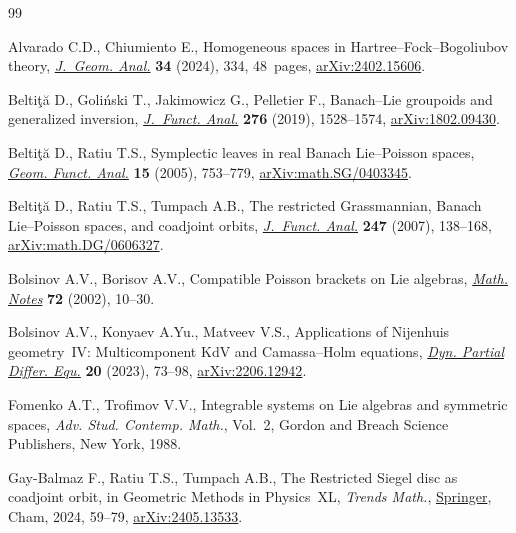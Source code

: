 \documentclass[10pt,a4paper]{amsart}
\theoremstyle{definition}
\numberwithin{equation}{section}
\let\MFOriginalCedilla\c
\renewcommand{\c}[1]{{\MFcedillafont\MFOriginalCedilla{#1}}}
\begin{document}
\begin{thebibliography}{99}
\footnotesize\itemsep=0pt

Alvarado C.D., Chiumiento E., Homogeneous spaces in
 {H}artree--{F}ock--{B}ogoliubov theory, \href{https://doi.org/10.1007/s12220-024-01776-6}{\textit{J.~Geom. Anal.}} \textbf{34}
 (2024), 334, 48~pages, \href{https://arxiv.org/abs/2402.15606}{arXiv:2402.15606}.

Belti\c{t}\u{a} D., Goli\'nski T., Jakimowicz G., Pelletier F., Banach--{L}ie
 groupoids and generalized inversion, \href{https://doi.org/10.1016/j.jfa.2018.12.002}{\textit{J.~Funct. Anal.}} \textbf{276}
 (2019), 1528--1574, \href{https://arxiv.org/abs/1802.09430}{arXiv:1802.09430}.

Belti\c{t}\u{a} D., Ratiu T.S., Symplectic leaves in real {B}anach
 {L}ie--{P}oisson spaces, \href{https://doi.org/10.1007/s00039-005-0524-9}{\textit{Geom. Funct. Anal.}} \textbf{15} (2005),
 753--779, \href{https://arxiv.org/abs/math.SG/0403345}{arXiv:math.SG/0403345}.

Belti\c{t}\u{a} D., Ratiu T.S., Tumpach A.B., The restricted {G}rassmannian,
 {B}anach {L}ie--{P}oisson spaces, and coadjoint orbits, \href{https://doi.org/10.1016/j.jfa.2007.03.001}{\textit{J.~Funct.
 Anal.}} \textbf{247} (2007), 138--168, \href{https://arxiv.org/abs/math.DG/0606327}{arXiv:math.DG/0606327}.

Bolsinov A.V., Borisov A.V., Compatible {P}oisson brackets on {L}ie algebras,
 \href{https://doi.org/10.1023/A:1019856702638}{\textit{Math. Notes}} \textbf{72} (2002), 10--30.

Bolsinov A.V., Konyaev A.Yu., Matveev V.S., Applications of {N}ijenhuis
 geometry~{IV}: {M}ulticomponent {K}d{V} and {C}amassa--{H}olm equations,
 \href{https://doi.org/10.4310/dpde.2023.v20.n1.a4}{\textit{Dyn. Partial Differ. Equ.}} \textbf{20} (2023), 73--98,
 \href{https://arxiv.org/abs/2206.12942}{arXiv:2206.12942}.

Fomenko A.T., Trofimov V.V., Integrable systems on {L}ie algebras and symmetric
 spaces, \textit{Adv. Stud. Contemp. Math.}, Vol.~2, Gordon and Breach Science
 Publishers, New York, 1988.

Gay-Balmaz F., Ratiu T.S., Tumpach A.B., The {R}estricted {S}iegel disc as
 coadjoint orbit, in Geometric {M}ethods in {P}hysics~{XL}, \textit{Trends Math.},
 \href{https://doi.org/10.1007/978-3-031-62407-0_6}{Springer}, Cham, 2024, 59--79, \href{https://arxiv.org/abs/2405.13533}{arXiv:2405.13533}.


\end{thebibliography}
\end{document}
